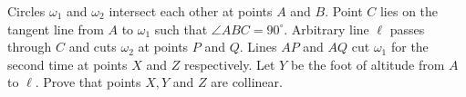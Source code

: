 Circles $\omega_1$ and $\omega_2$ intersect each other at points $A$ and $B$. Point $C$ lies on the tangent line from $A$ to $\omega_1$ such that
$\angle ABC = 90^\circ$. Arbitrary line $\ell$ passes through $C$ and cuts $\omega_2$ at points $P$ and $Q$. Lines $AP$ and $AQ$ cut $\omega_1$ for the second time at points $X$ and $Z$ respectively. Let $Y$ be the foot of altitude from $A$ to $\ell$. Prove that points $X, Y$ and $Z$ are collinear.
